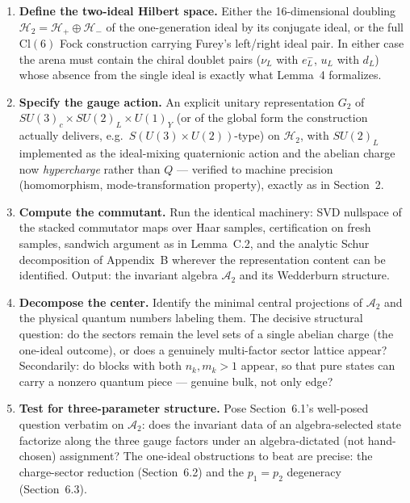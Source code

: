 \documentclass[11pt]{article}
\newcommand{\Alg}{\mathcal{A}}
\begin{document}
\begin{enumerate}

\item \textbf{Define the two-ideal Hilbert space.} Either the 16-dimensional doubling $\mathcal{H}_2 = \mathcal{H}_+ \oplus \mathcal{H}_-$ of the one-generation ideal by its conjugate ideal, or the full $\mathrm{Cl}(6)$ Fock construction carrying Furey's left/right ideal pair. In either case the arena must contain the chiral doublet pairs ($\nu_L$ with $e^-_L$, $u_L$ with $d_L$) whose absence from the single ideal is exactly what Lemma~4 formalizes.

\item \textbf{Specify the gauge action.} An explicit unitary representation $G_2$ of $SU(3)_c \times SU(2)_L \times U(1)_Y$ (or of the global form the construction actually delivers, e.g.\ $S(U(3) \times U(2))$-type) on $\mathcal{H}_2$, with $SU(2)_L$ implemented as the ideal-mixing quaternionic action and the abelian charge now \emph{hypercharge} rather than $Q$ --- verified to machine precision (homomorphism, mode-transformation property), exactly as in Section~2.

\item \textbf{Compute the commutant.} Run the identical machinery: SVD nullspace of the stacked commutator maps over Haar samples, certification on fresh samples, sandwich argument as in Lemma~C.2, and the analytic Schur decomposition of Appendix~B wherever the representation content can be identified. Output: the invariant algebra $\Alg_2$ and its Wedderburn structure.

\item \textbf{Decompose the center.} Identify the minimal central projections of $\Alg_2$ and the physical quantum numbers labeling them. The decisive structural question: do the sectors remain the level sets of a single abelian charge (the one-ideal outcome), or does a genuinely multi-factor sector lattice appear? Secondarily: do blocks with both $n_k, m_k > 1$ appear, so that pure states can carry a nonzero quantum piece --- genuine bulk, not only edge?

\item \textbf{Test for three-parameter structure.} Pose Section~6.1's well-posed question verbatim on $\Alg_2$: does the invariant data of an algebra-selected state factorize along the three gauge factors under an algebra-dictated (not hand-chosen) assignment? The one-ideal obstructions to beat are precise: the charge-sector reduction (Section~6.2) and the $p_1 = p_2$ degeneracy (Section~6.3).

\end{enumerate}
\end{document}
